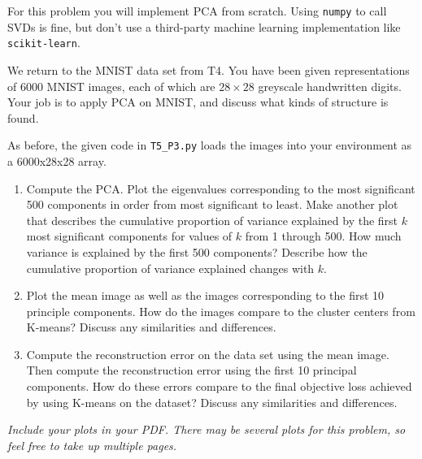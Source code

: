 \documentclass[submit]{harvardml}
\begin{document}
\begin{problem}

For this problem you will implement PCA from scratch.  Using
\texttt{numpy} to call SVDs is fine, but don't use a third-party
machine learning implementation like \texttt{scikit-learn}.

We return to the MNIST data set from T4. You have been given
representations of 6000 MNIST images, each of which are $28\times28$
greyscale handwritten digits. Your job is to apply PCA on MNIST, and
discuss what kinds of structure is found.

As before, the given code in \texttt{T5\_P3.py} loads the images into your environment as a
6000x28x28 array.

\begin{enumerate}

\item Compute the PCA. Plot the eigenvalues corresponding to the most significant 500
  components in order from most significant to least. Make another plot that describes the cumulative proportion of variance explained by the first $k$ most significant components for values of $k$ from 1 through 500.
  How much variance is explained by the first 500 components?  Describe
  how the cumulative proportion of variance explained changes with $k$.

\item Plot the mean image as well as the images corresponding to the
  first 10 principle components.  How do the images compare to the
  cluster centers from K-means? Discuss any similarities and
  differences.

\item Compute the reconstruction error on the data set using the mean
  image. Then compute the reconstruction error using the first 10 principal components. How do these
  errors compare to the final objective loss achieved by using K-means on the dataset? Discuss any similarities and
  differences.

\end{enumerate}


\textit{Include your plots in your PDF. There may be several plots for this problem, so feel free to take up multiple pages.}


\end{problem}

\newpage
\end{document}
